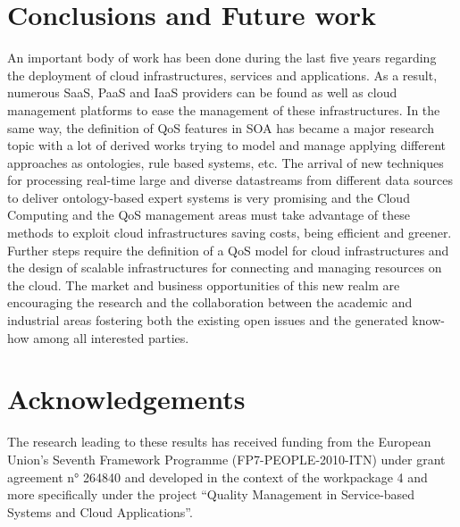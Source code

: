 \section{Conclusions and Future work}\label{sect:conclusions}
An important body of work has been done during the last five years regarding the
deployment of cloud infrastructures, services and applications. As a result,
numerous SaaS, PaaS and IaaS providers can be found as well as cloud management
platforms to ease the management of these infrastructures. In the same way, the
definition of QoS features in SOA has became a major research topic with a lot
of derived works trying to model and manage applying different approaches as
ontologies, rule based systems, etc. The arrival of new techniques for
processing real-time large and diverse datastreams from different data sources
to deliver ontology-based expert systems is very promising and the Cloud
Computing and the QoS management areas must take advantage of these methods to exploit cloud
infrastructures saving costs, being efficient and greener. Further steps require
the definition of a QoS model for cloud infrastructures and the design of
scalable infrastructures for connecting and managing resources on the cloud. The
market and business opportunities of this new realm are encouraging the research and the
collaboration between the academic and industrial areas fostering both the existing open
issues and the generated know-how among all interested parties.

\section{Acknowledgements}\label{sect:ack}
The research leading to these results has received funding from the European Union’s Seventh Framework Programme (FP7-PEOPLE-2010-ITN) 
under grant agreement n° 264840 and developed in the context of the workpackage 4 and more specifically under the project 
``Quality Management in Service-based Systems and Cloud Applications''.

